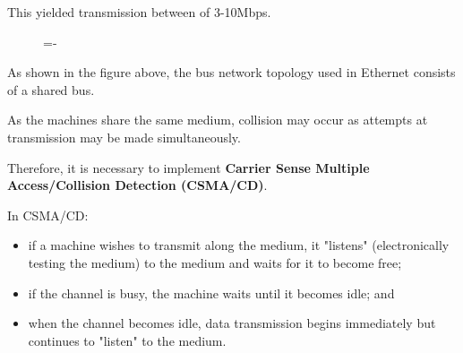 \documentclass[a4paper]{systems-software}
\begin{document}
This yielded transmission between of 3-10Mbps.

\begin{figure}[H]
	\lineskip=-\fboxrule
\end{figure}

As shown in the figure above, the bus network topology used in Ethernet consists of a shared bus.

As the machines share the same medium, collision may occur as attempts at transmission may be made simultaneously.

Therefore, it is necessary to implement \textbf{Carrier Sense Multiple Access/Collision Detection (CSMA/CD)}.

In CSMA/CD:
\begin{itemize}
	\item if a machine wishes to transmit along the medium, it "listens" (electronically testing the medium) to the medium and waits for it to become free;
	\item if the channel is busy, the machine waits until it becomes idle; and
	\item when the channel becomes idle, data transmission begins immediately but continues to "listen" to the medium.
\end{itemize}
\end{document}
